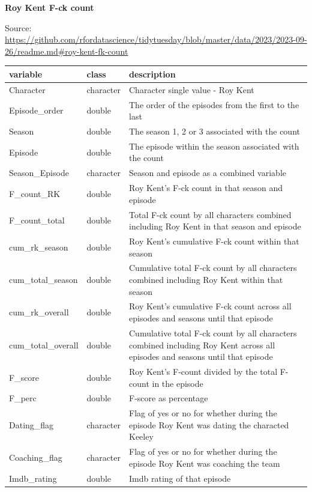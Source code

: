 \documentclass[
]{book}
\begin{document}
\textbf{Roy Kent F-ck count}

Source: \url{https://github.com/rfordatascience/tidytuesday/blob/master/data/2023/2023-09-26/readme.md\#roy-kent-fk-count}

\begin{longtable}[]{@{}
  >{\raggedright\arraybackslash}p{}
  >{\raggedright\arraybackslash}p{}
  >{\raggedright\arraybackslash}p{}@{}}
\toprule\noalign{}
\begin{minipage}[b]{\linewidth}\raggedright
variable
\end{minipage} & \begin{minipage}[b]{\linewidth}\raggedright
class
\end{minipage} & \begin{minipage}[b]{\linewidth}\raggedright
description
\end{minipage} \\
\midrule\noalign{}
\endhead
\bottomrule\noalign{}
\endlastfoot
Character & character & Character single value - Roy Kent \\
Episode\_order & double & The order of the episodes from the first to the last \\
Season & double & The season 1, 2 or 3 associated with the count \\
Episode & double & The episode within the season associated with the count \\
Season\_Episode & character & Season and episode as a combined variable \\
F\_count\_RK & double & Roy Kent's F-ck count in that season and episode \\
F\_count\_total & double & Total F-ck count by all characters combined including Roy Kent in that season and episode \\
cum\_rk\_season & double & Roy Kent's cumulative F-ck count within that season \\
cum\_total\_season & double & Cumulative total F-ck count by all characters combined including Roy Kent within that season \\
cum\_rk\_overall & double & Roy Kent's cumulative F-ck count across all episodes and seasons until that episode \\
cum\_total\_overall & double & Cumulative total F-ck count by all characters combined including Roy Kent across all episodes and seasons until that episode \\
F\_score & double & Roy Kent's F-count divided by the total F-count in the episode \\
F\_perc & double & F-score as percentage \\
Dating\_flag & character & Flag of yes or no for whether during the episode Roy Kent was dating the characted Keeley \\
Coaching\_flag & character & Flag of yes or no for whether during the episode Roy Kent was coaching the team \\
Imdb\_rating & double & Imdb rating of that episode \\
\end{longtable}
\end{document}
